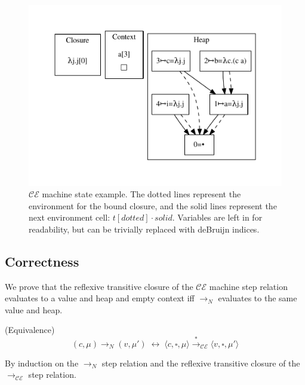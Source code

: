 \begin{figure}
\includegraphics[width=\linewidth]{figures/18.pdf}

\caption{$\mathcal{CE}$ machine state example.  The dotted lines represent the
environment for the bound closure, and the solid lines represent the next
environment cell:  $t[dotted] \cdot solid$.  Variables are left in for
readability, but can be trivially replaced with deBruijn indices.  }
\label{fig:state}
\end{figure}

\subsection{Correctness}
We prove that the reflexive transitive closure of the $\mathcal{CE}$ machine
step relation evaluates to a value and heap and empty context iff
$\xrightarrow{}_{N}$ evaluates to the same value and heap.

{\theorem \textnormal{(Equivalence)} $$(c, \mu) \rightarrow_{N} (v, \mu') \;
\leftrightarrow \; \langle c, \square, \mu \rangle \xrightarrow{*
}_{\mathcal{CE}} \langle v, \square, \mu' \rangle $$} 

By induction on the $\rightarrow_{N}$ step relation and the reflexive transitive
closure of the $\rightarrow_{\mathcal{CE}}$ step relation.

